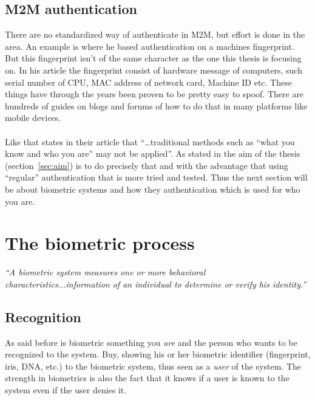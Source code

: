 \subsection{M2M authentication}
There are no standardized way of authenticate in M2M, but effort is done in the area. An example is \cite[]{auth:M2M} where he based authentication on a machines fingerprint. But this fingerprint isn't of the same character as the one this thesis is focusing on. In his article the fingerprint consist of hardware message of computers, such serial number of CPU, MAC address of network card, Machine ID etc. These things have through the years been proven to be pretty easy to spoof. There are hundreds of guides on blogs and forums of how to do that in many platforms like mobile devices. \\
\\
Like \cite[]{auth:M2Mcom} that states in their article that ``\dots traditional methods such as “what you know and who you are” may not be applied''. As stated in the aim of the thesis (section~\ref{sec:aim}) is to do precisely that and with the advantage that using ``regular'' authentication that is more  tried and tested. Thus the next section will be about biometric systems and how they authentication which is used for who you are.


\section{The biometric process}\label{sec:biometric}
\begin{center}\textit{``A biometric system measures one or more behavioral characteristics...information of an individual to determine or verify his identity.''} \cite[p.~3]{introbio}\end{center}

\subsection{Recognition}
As said before is biometric something you \textit{are} and the person who wants to be recognized to the system. Buy, showing his or her biometric identifier (fingerprint, iris, DNA, etc.) to the biometric system, thus seen as a \textit{user} of the system. The strength in biometrics is also the fact that it knows if a user is known to the system even if the user denies it. \cite[ch.~1]{introbio}

